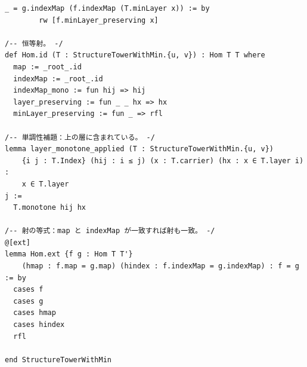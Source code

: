 \documentclass[11pt]{ltjsarticle}
\theoremstyle{definition}
\theoremstyle{plain}
\theoremstyle{remark}
\begin{document}
\begin{lstlisting}[caption={P2.lean}, label={lst:p2}]
    _ = g.indexMap (f.indexMap (T.minLayer x)) := by
        rw [f.minLayer_preserving x]

/-- 恒等射。 -/
def Hom.id (T : StructureTowerWithMin.{u, v}) : Hom T T where
  map := _root_.id
  indexMap := _root_.id
  indexMap_mono := fun hij => hij
  layer_preserving := fun _ _ hx => hx
  minLayer_preserving := fun _ => rfl

/-- 単調性補題：上の層に含まれている。 -/
lemma layer_monotone_applied (T : StructureTowerWithMin.{u, v})
    {i j : T.Index} (hij : i ≤ j) (x : T.carrier) (hx : x ∈ T.layer i) :
    x ∈ T.layer 
j :=
  T.monotone hij hx

/-- 射の等式：map と indexMap が一致すれば射も一致。 -/
@[ext]
lemma Hom.ext {f g : Hom T T'}
    (hmap : f.map = g.map) (hindex : f.indexMap = g.indexMap) : f = g := by
  cases f
  cases g
  cases hmap
  cases hindex
  rfl

end StructureTowerWithMin
\end{lstlisting}
\end{document}

